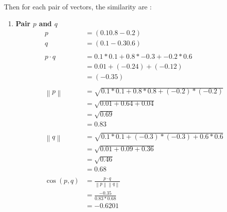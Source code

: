 \documentclass[12pt]{article}%
\begin{document}
\begin{enumerate}
\begin{enumerate}
		\par Then for each pair of vectors, the similarity are :
		\begin{enumerate}
			\item \textbf{Pair $p$ and $q$}
			\begin{align*}
				 p & = (0.1 0.8 -0.2) \\ 
				 q & = (0.1 -0.3 0.6) \\ 
				 \\
				 p \cdot q & = 0.1 * 0.1 + 0.8 * -0.3 + -0.2 * 0.6 \\
				 & = 0.01 + (-0.24) + (-0.12) \\
				 & = (-0.35)\\ 
				 \\
				 \left \| p \right \| & = \sqrt{0.1 * 0.1 + 0.8 * 0.8 + (-0.2)*(-0.2)} \\
				 & = \sqrt{0.01 + 0.64 + 0.04} \\
				 & = \sqrt{0.69} \\
				 & = 0.83\\
				 \\
				 \left \| q \right \| & = \sqrt{0.1 * 0.1 + (-0.3) * (-0.3) + 0.6*0.6} \\
				 & = \sqrt{0.01 + 0.09 + 0.36} \\ 
				 & = \sqrt{0.46} \\
				 & = 0.68 \\
				 \\
				 \cos (p,q) & = \frac{p\cdot q}{\left \| p \right \| \left \| q \right \|} \\
				 & = \frac{-0.35}{0.83 * 0.68} \\
				 & = -0.6201 \\
			\end{align*}
			

\end{enumerate}
\end{enumerate}
\end{enumerate}
\end{document}
